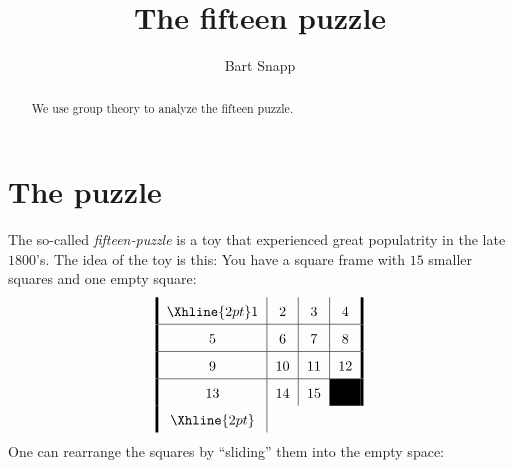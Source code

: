 \documentclass{ximera}
\author{Bart Snapp}
\title{The fifteen puzzle}
\begin{document}
\begin{abstract}
  We use group theory to analyze the fifteen puzzle.
\end{abstract}
\maketitle


\section{The puzzle}

The so-called \textit{fifteen-puzzle} is a toy that experienced great
populatrity in the late $1800$'s. The idea of the toy is this: You
have a square frame with $15$ smaller squares and one empty square:
\[
\arraycolsep=6pt\def\arraystretch{1.6}
\begin{array}{!{\vline width 2pt}c|c|c|c!{\vline width 2pt}}
    \Xhline{2pt}
    1  & 2  & 3  & 4 \\ \hline
    5  & 6  & 7  & 8 \\ \hline
    9  & 10 & 11 & 12 \\ \hline
    13 & 14 & 15 & \cellcolor{black}\\%
    \Xhline{2pt}
\end{array}
\]
One can rearrange the squares by ``sliding'' them into the empty
space:
\end{document}
